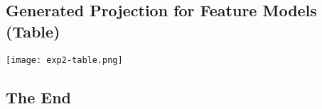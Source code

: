 \documentclass[
	aspectratio=169, %
	8pt, %
]{beamer}
\begin{document}
\subsection{Generated Projection for Feature Models (Table)}
\begin{frame}{\insertsubsection}
    \centering
    \texttt{[image: exp2-table.png]}
\end{frame}


\subsection{The End}
\againtitle
\end{document}
